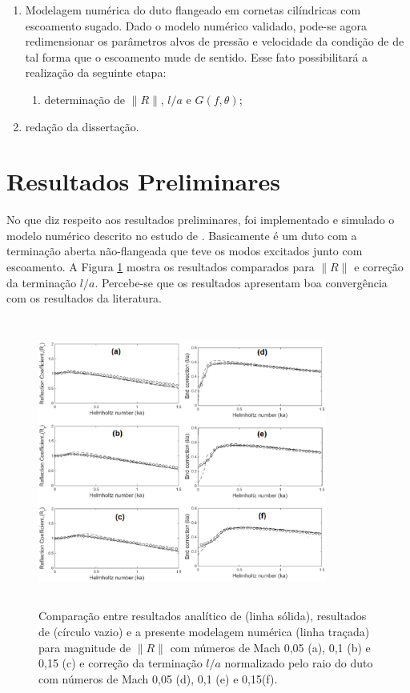 \begin{enumerate}
    \item Modelagem numérica do duto flangeado em cornetas cilíndricas com escoamento sugado. Dado o modelo numérico validado, pode-se agora redimensionar os parâmetros alvos de pressão e velocidade da condição de  de tal forma que o escoamento mude de sentido. Esse fato possibilitará a realização da seguinte etapa:
        \begin{enumerate}
            \item determinação de $\|R\|$, $l/a$ e $G(f,\theta)$;
        \end{enumerate}
    \item redação da dissertação.
\end{enumerate}
 

\section{Resultados Preliminares}
\label{chapter:resultados}

No que diz respeito aos resultados preliminares, foi implementado e simulado o modelo numérico descrito no estudo de . Basicamente é um duto com a terminação aberta não-flangeada que teve os modos excitados junto com escoamento. A Figura \ref{fig:duto_1} mostra os resultados comparados para $\|R\|$ e correção da terminação $l/a$. Percebe-se que os resultados apresentam boa convergência com os resultados da literatura.

\begin{figure}[h]
	\centering
	 \includegraphics[width=9.5cm, height=9.5cm]{figuras/duto_1.eps}
	\caption{Comparação entre resultados analítico de  (linha sólida), resultados de  (círculo vazio) e a presente modelagem numérica (linha traçada) para magnitude de $\|R\|$ com números de Mach 0,05 (a), 0,1 (b) e 0,15 (c) e correção da terminação $l/a$ normalizado pelo raio do duto com números de Mach 0,05 (d), 0,1 (e) e 0,15(f).}
	\label{fig:duto_1}
\end{figure}

